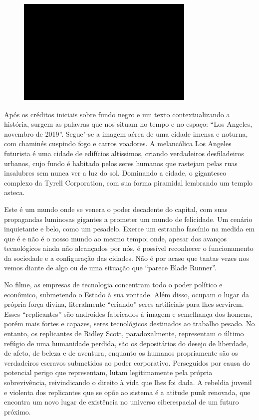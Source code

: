 \begin{figure}[!ht]
\centering
 \includegraphics[width=85mm]{./imgs/im1.jpg}
\caption{\tiny{}}
\end{figure}

Após os créditos iniciais sobre fundo negro e um texto contextualizando
a história, surgem as palavras que nos situam no tempo e no espaço:
``Los Angeles, novembro de 2019''. Segue"-se a imagem aérea de uma cidade
imensa e noturna, com chaminés cuspindo fogo e carros voadores. A melancólica Los Angeles futurista é uma cidade de
edifícios altíssimos, criando verdadeiros desfiladeiros urbanos, cujo
fundo é habitado pelos seres humanos que rastejam pelas ruas insalubres
sem nunca ver a luz do sol. Dominando a cidade, o gigantesco complexo da
Tyrell Corporation, com sua forma piramidal lembrando um templo asteca.

Este é um mundo onde se venera o poder decadente do capital, com suas
propagandas luminosas gigantes a prometer um mundo de felicidade. Um
cenário inquietante e belo, como um pesadelo. Exerce um estranho
fascínio na medida em que é e não é o nosso mundo ao mesmo tempo; onde,
apesar dos avanços tecnológicos ainda não alcançados por nós, é possível
reconhecer o funcionamento da sociedade e a configuração das cidades.
Não é por acaso que tantas vezes nos vemos diante de algo ou de uma
situação que ``parece Blade Runner''.

No filme, as empresas de tecnologia concentram todo o poder político e
econômico, submetendo o Estado à sua vontade. Além disso, ocupam o lugar
da própria força divina, literalmente ``criando'' seres artificiais para
lhes servirem. Esses ``replicantes'' são androides fabricados à imagem e
semelhança dos homens, porém mais fortes e capazes, seres
tecnológicos destinados ao trabalho pesado. No entanto, os replicantes
de Ridley Scott, paradoxalmente, representam o último refúgio de uma
humanidade perdida, são os depositários do desejo de liberdade, de
afeto, de beleza e de aventura, enquanto os humanos propriamente são os
verdadeiros escravos submetidos ao poder corporativo. Perseguidos por
causa do potencial perigo que representam, lutam legitimamente pela
própria sobrevivência, reivindicando o direito à vida que lhes foi dada.
A rebeldia juvenil e violenta dos replicantes que se opõe ao sistema é a
atitude punk renovada, que encontra um novo lugar de existência no
universo ciberespacial de um futuro próximo.

